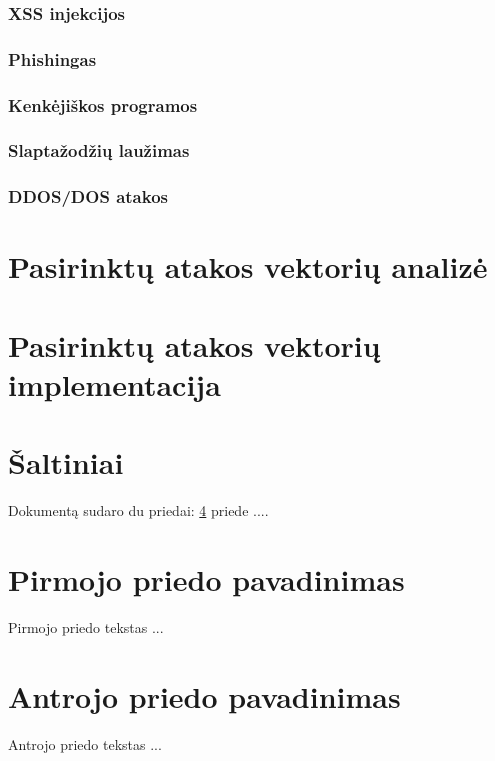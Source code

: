 \documentclass[a4paper,12pt,fleqn]{article}
\begin{document}
\subsubsection{XSS injekcijos}
\subsubsection{Phishingas}
\subsubsection{Kenkėjiškos programos}
\subsubsection{Slaptažodžių laužimas}
\subsubsection{DDOS/DOS atakos}
\section{Pasirinktų atakos vektorių analizė}

\section{Pasirinktų atakos vektorių implementacija}


\section{Šaltiniai}






\newpage
\begin{appendices}
Dokumentą sudaro du priedai: \ref{app:a} priede  ....
\newpage
\section{Pirmojo priedo pavadinimas}
\label{app:a}
Pirmojo priedo tekstas ...

\newpage
\section{Antrojo priedo pavadinimas}
Antrojo priedo tekstas ...

\end{appendices}
\end{document}
